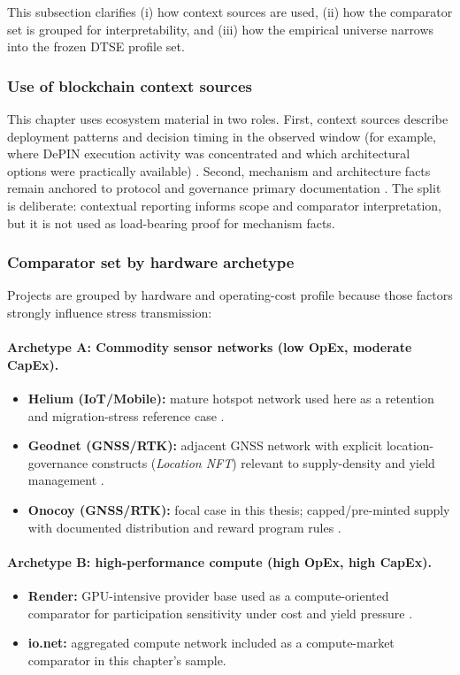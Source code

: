 This subsection clarifies (i) how context sources are used, (ii) how the comparator set is grouped for interpretability, and (iii) how the empirical universe narrows into the frozen DTSE profile set.

\subsubsection{Use of blockchain context sources}
This chapter uses ecosystem material in two roles. First, context sources describe deployment patterns and decision timing in the observed window (for example, where DePIN execution activity was concentrated and which architectural options were practically available) \cite{Messari2024, FrontiersDePIN2025}. Second, mechanism and architecture facts remain anchored to protocol and governance primary documentation \cite{HeliumHIP70, OnocoyWhitepaper301, OnocoyToken}. The split is deliberate: contextual reporting informs scope and comparator interpretation, but it is not used as load-bearing proof for mechanism facts.

\subsubsection{Comparator set by hardware archetype}
Projects are grouped by hardware and operating-cost profile because those factors strongly influence stress transmission:

\paragraph{Archetype A: Commodity sensor networks (low OpEx, moderate CapEx).}
\begin{itemize}
    \item \textbf{Helium (IoT/Mobile):} mature hotspot network used here as a retention and migration-stress reference case \cite{FrontiersDePIN2025}.
    \item \textbf{Geodnet (GNSS/RTK):} adjacent GNSS network with explicit location-governance constructs (\emph{Location NFT}) relevant to supply-density and yield management \cite{GeodnetLocationNFT}.
    \item \textbf{Onocoy (GNSS/RTK):} focal case in this thesis; capped/pre-minted supply with documented distribution and reward program rules \cite{OnocoyWhitepaper301, OnocoyToken, OnocoyRewards}.
\end{itemize}

\paragraph{Archetype B: high-performance compute (high OpEx, high CapEx).}
\begin{itemize}
    \item \textbf{Render:} GPU-intensive provider base used as a compute-oriented comparator for participation sensitivity under cost and yield pressure \cite{Lin2024, FrontiersDePIN2025}.
    \item \textbf{io.net:} aggregated compute network included as a compute-market comparator in this chapter's sample.
\end{itemize}

